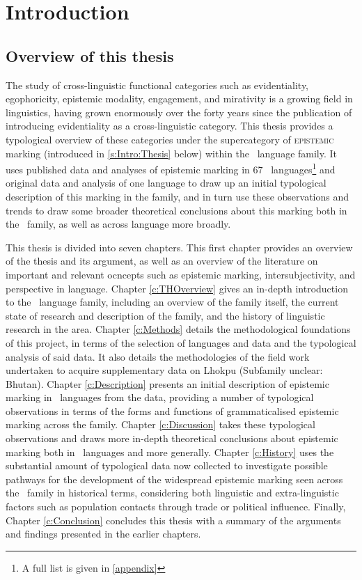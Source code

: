 \chapter{Introduction}\label{c:Introduction}
\section{Overview of this thesis}
The study of cross-linguistic functional categories such as evidentiality, egophoricity, epistemic modality, engagement, and mirativity is a growing field in linguistics, having grown enormously over the forty years since the publication of  introducing evidentiality as a cross-linguistic category. This thesis provides a typological overview of these categories under the supercategory of \textsc{epistemic} marking (introduced in \ref{s:Intro:Thesis} below) within the \lfam\ language family. It uses published data and analyses of epistemic marking in 67 \lfam\ languages\footnote{A full list is given in \ref{appendix}} and original data and analysis of one language to draw up an initial typological description of this marking in the family, and in turn use these observations and trends to draw some broader theoretical conclusions about this marking both in the \lfam\ family, as well as across language more broadly.

This thesis is divided into seven chapters. This first chapter provides an overview of the thesis and its argument, as well as an overview of the literature on important and relevant ocncepts such as epistemic marking, intersubjectivity, and perspective in language. Chapter \ref{c:THOverview} gives an in-depth introduction to the \lfam\ language family, including an overview of the family itself, the current state of research and description of the family, and the history of linguistic research in the area. Chapter \ref{c:Methods} details the methodological foundations of this project, in terms of the selection of languages and data and the typological analysis of said data. It also details the methodologies of the field work undertaken to acquire supplementary data on Lhokpu (Subfamily unclear: Bhutan). Chapter \ref{c:Description} presents an initial description of epistemic marking in \lfam\ languages from the data, providing a number of typological observations in terms of the forms and functions of grammaticalised epistemic marking across the family. Chapter \ref{c:Discussion} takes these typological observations and draws more in-depth theoretical conclusions about epistemic marking both in \lfam\ languages and more generally. Chapter \ref{c:History} uses the substantial amount of typological data now collected to investigate possible pathways for the development of the widespread epistemic marking seen across the \lfam\ family in historical terms, considering both linguistic and extra-linguistic factors such as population contacts through trade or political influence. Finally, Chapter \ref{c:Conclusion} concludes this thesis with a summary of the arguments and findings presented in the earlier chapters.


